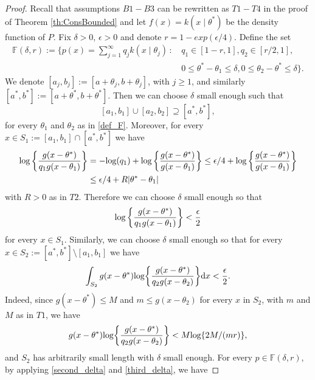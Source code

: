 \documentclass[12pt]{article}
\def\log{\hbox{log}}
\begin{document}
\begin{proof}
Recall that assumptions $B1-B3$ can be rewritten as $T1-T4$ in the proof of Theorem \ref{th:ConsBounded} and let $f(x) = k(x\mid \theta^*)$ be the density function of $P$. Fix $\delta > 0$, $\epsilon > 0$ and denote $r= 1-exp(\epsilon/4)$. Define the set
\begin{equation}\label{def_F}
\begin{aligned}
\mathbb{F}(\delta, r) := \biggl\{p(x)=\sum_{j=1}^{\infty} q_j k(x \mid \theta_j) \, : \, &q_1 \in [1-r, 1], q_2 \in [r/2, 1],\\
& 0 \leq \theta^\ast -\theta_1 \leq \delta,0 \leq \theta_2 -\theta^\ast \leq \delta \biggr\}.
\end{aligned}
\end{equation}
We denote $[a_j, b_j] := [a+\theta_j, b+\theta_j]$, with $j \geq 1$, and similarly $[a^*, b^*] := [a + \theta^*, b+\theta^*]$. Then we can choose $\delta$ small enough such that
\[
[a_1,b_1] \cup [a_2, b_2] \supseteq [a^\ast, b^\ast],
\]
for every $\theta_1$ and $\theta_2$ as in \eqref{def_F}. Moreover, for every $x \in S_1 := [a_1, b_1] \cap [a^\ast, b^\ast]$ we have
\[
\begin{aligned}
\log\left\{\frac{g(x-\theta^\ast)}{q_1 g(x-\theta_1)} \right\}&=-\log(q_1)+ \log\left\{\frac{g(x-\theta^\ast)}{g(x-\theta_1)}\right\} \leq \epsilon/4 + \log\left\{\frac{g(x-\theta^\ast)}{g(x-\theta_1)}\right\}\\
& \leq \epsilon/4+R|\theta^*-\theta_1|\,
\end{aligned}
\]
with $R > 0$ as in $T2$. Therefore we can choose $\delta$ small enough so that
\begin{equation}\label{second_delta}
\log\left\{\frac{g(x-\theta^\ast)}{q_1 g(x-\theta_1)} \right\} < \frac{\epsilon}{2}
\end{equation}
for every $x \in S_1$. Similarly, we can choose $\delta$ small enough so that for every $x \in S_2 :=[a^\ast, b^\ast] \setminus [a_1, b_1]$ we have
\begin{equation}\label{third_delta}
\int_{S_2 } g(x-\theta^\ast) \log\bigg\{\frac{g(x-\theta^\ast)}{q_{2} g(x-\theta_2)} \bigg\} \mathrm{d}x  < \frac{\epsilon}{2}.
\end{equation}
Indeed, since $g(x-\theta^*) \leq M$ and $m \leq g(x-\theta_2)$ for every $x$ in $S_2$, with $m$ and $M$ as in $T1$, we have
\[
g(x-\theta^\ast) \log\bigg\{\frac{g(x-\theta^\ast)}{q_2 g(x-\theta_2)} \bigg\} < M \log\{2M/(mr) \},
\]
and $S_2$ has arbitrarily small length with $\delta$ small enough. For every $p \in \mathbb{F}(\delta, r)$, by applying \eqref{second_delta} and \eqref{third_delta}, we have

\end{proof}
\end{document}
